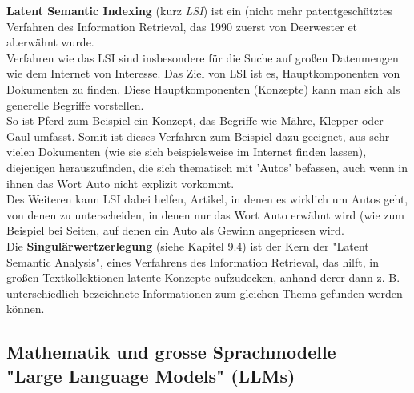 \documentclass[12pt]{article}
\begin{document}
\textbf{Latent Semantic Indexing} (kurz \textit{LSI}) ist ein (nicht mehr patentgeschütztes Verfahren des Information Retrieval, das 1990 zuerst von Deerwester et al.erwähnt wurde.\\[0.2cm]
Verfahren wie das LSI sind insbesondere für die Suche auf großen Datenmengen wie dem Internet von Interesse. Das Ziel von LSI ist es, Hauptkomponenten von Dokumenten zu finden. Diese Hauptkomponenten (Konzepte) kann man sich als generelle Begriffe vorstellen.\\
So ist Pferd zum Beispiel ein Konzept, das Begriffe wie Mähre, Klepper oder Gaul umfasst. Somit ist dieses Verfahren zum Beispiel dazu geeignet, aus sehr vielen Dokumenten (wie sie sich beispielsweise im Internet finden lassen), diejenigen herauszufinden, die sich thematisch mit 'Autos' befassen, auch wenn in ihnen das Wort Auto nicht explizit vorkommt.\\
 Des Weiteren kann LSI dabei helfen, Artikel, in denen es wirklich um Autos geht, von denen zu unterscheiden, in denen nur das Wort Auto erwähnt wird (wie zum Beispiel bei Seiten, auf denen ein Auto als Gewinn angepriesen wird.\\
Die \textbf{Singulärwertzerlegung} (siehe Kapitel 9.4) ist der Kern der "Latent Semantic Analysis", eines Verfahrens des Information Retrieval, das hilft, in großen Textkollektionen latente Konzepte aufzudecken, anhand derer dann z. B. unterschiedlich bezeichnete Informationen zum gleichen Thema gefunden werden können.\\


\subsection{Mathematik und grosse Sprachmodelle \\ "Large Language Models" (LLMs)}
\end{document}
